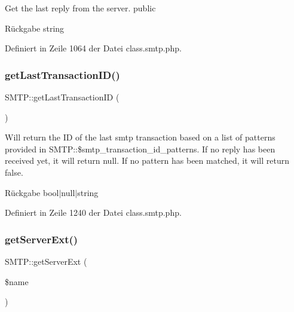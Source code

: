 Get the last reply from the server.  public \begin{DoxyReturn}{Rückgabe}
string 
\end{DoxyReturn}


Definiert in Zeile 1064 der Datei class.\+smtp.\+php.

\mbox{\label{class_s_m_t_p_af9226bb26b40f9c999cfdb90f23c050c}} 
\subsubsection{\texorpdfstring{get\+Last\+Transaction\+I\+D()}{getLastTransactionID()}}
{\footnotesize\ttfamily S\+M\+T\+P\+::get\+Last\+Transaction\+ID (\begin{DoxyParamCaption}{ }\end{DoxyParamCaption})}

Will return the ID of the last smtp transaction based on a list of patterns provided in S\+M\+T\+P\+::\$smtp\+\_\+transaction\+\_\+id\+\_\+patterns. If no reply has been received yet, it will return null. If no pattern has been matched, it will return false. \begin{DoxyReturn}{Rückgabe}
bool$\vert$null$\vert$string 
\end{DoxyReturn}


Definiert in Zeile 1240 der Datei class.\+smtp.\+php.

\mbox{\label{class_s_m_t_p_ac2b1d73e9fde787c2be1ede45aba7ace}} 
\subsubsection{\texorpdfstring{get\+Server\+Ext()}{getServerExt()}}
{\footnotesize\ttfamily S\+M\+T\+P\+::get\+Server\+Ext (\begin{DoxyParamCaption}\item[{}]{\$name }\end{DoxyParamCaption})}

